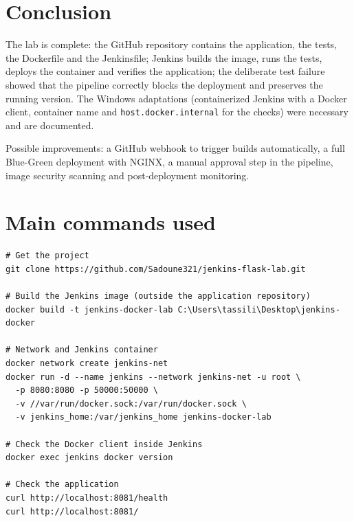 \documentclass[11pt,a4paper]{article}
\begin{document}
\section{Conclusion}

The lab is complete: the GitHub repository contains the application, the tests, the
Dockerfile and the Jenkinsfile; Jenkins builds the image, runs the tests, deploys the
container and verifies the application; the deliberate test failure showed that the
pipeline correctly blocks the deployment and preserves the running version. The Windows
adaptations (containerized Jenkins with a Docker client, container name and
\texttt{host.docker.internal} for the checks) were necessary and are documented.

Possible improvements: a GitHub webhook to trigger builds automatically, a full Blue-Green
deployment with NGINX, a manual approval step in the pipeline, image security scanning and
post-deployment monitoring.

\appendix
\section{Main commands used}

\begin{lstlisting}
# Get the project
git clone https://github.com/Sadoune321/jenkins-flask-lab.git

# Build the Jenkins image (outside the application repository)
docker build -t jenkins-docker-lab C:\Users\tassili\Desktop\jenkins-docker

# Network and Jenkins container
docker network create jenkins-net
docker run -d --name jenkins --network jenkins-net -u root \
  -p 8080:8080 -p 50000:50000 \
  -v //var/run/docker.sock:/var/run/docker.sock \
  -v jenkins_home:/var/jenkins_home jenkins-docker-lab

# Check the Docker client inside Jenkins
docker exec jenkins docker version

# Check the application
curl http://localhost:8081/health
curl http://localhost:8081/
\end{lstlisting}
\end{document}
